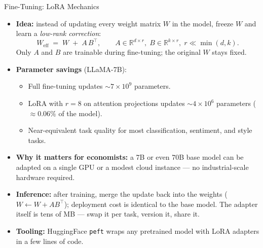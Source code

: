 \begin{frame}{Fine-Tuning: LoRA Mechanics}
\begin{itemize}
\item \textbf{Idea:} instead of updating every weight matrix $W$ in the model, freeze $W$ and learn a \emph{low-rank correction}:
\[
   W_{\text{eff}} \;=\; W \;+\; A\,B^{\top}, \qquad A \in \mathbb{R}^{d \times r},\; B \in \mathbb{R}^{k \times r},\; r \ll \min(d, k).
\]
Only $A$ and $B$ are trainable during fine-tuning; the original $W$ stays fixed.

\medskip
\item \textbf{Parameter savings} (LLaMA-7B):
\begin{itemize}
    \item Full fine-tuning updates $\sim\!7 \times 10^{9}$ parameters.
    \item LoRA with $r = 8$ on attention projections updates $\sim\!4 \times 10^{6}$ parameters ($\approx 0.06\%$ of the model).
    \item Near-equivalent task quality for most classification, sentiment, and style tasks.
\end{itemize}

\medskip
\item \textbf{Why it matters for economists:} a 7B or even 70B base model can be adapted on a single GPU or a modest cloud instance --- no industrial-scale hardware required.

\medskip
\item \textbf{Inference:} after training, merge the update back into the weights ($W \leftarrow W + A B^{\top}$); deployment cost is identical to the base model. The adapter itself is tens of MB --- swap it per task, version it, share it.

\medskip
\item \textbf{Tooling:} HuggingFace \texttt{peft} wraps any pretrained model with LoRA adapters in a few lines of code.
\end{itemize}
\end{frame}

